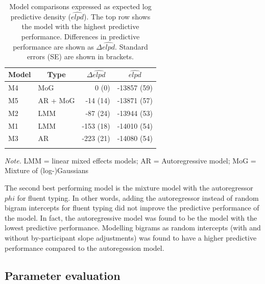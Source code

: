 \documentclass[english,man,floatsintext]{apa7}
\begin{document}
\begin{table}[!ht]

\begin{center}
\begin{threeparttable}

\caption{\label{tab:modelcomparisons}Model comparisons expressed as expected log predictive density ($\widehat{elpd}$). The top row shows the model with the highest predictive performance. Differences in predictive performance are shown as $\Delta\widehat{elpd}$. Standard errors (SE) are shown in brackets.}

\begin{tabular}{llrr}
\toprule
Model & \multicolumn{1}{c}{Type} & \multicolumn{1}{c}{$\Delta\widehat{elpd}$} & \multicolumn{1}{c}{$\widehat{elpd}$}\\
\midrule
M4 & MoG & 0 (0) & -13857 (59)\\
M5 & AR + MoG & -14 (14) & -13871 (57)\\
M2 & LMM & -87 (24) & -13944 (53)\\
M1 & LMM & -153 (18) & -14010 (54)\\
M3 & AR & -223 (21) & -14080 (54)\\
\bottomrule
\addlinespace
\end{tabular}

\begin{tablenotes}[para]
\normalsize{\textit{Note.} LMM = linear mixed effects models; AR = Autoregressive model; MoG = Mixture of (log-)Gaussians}
\end{tablenotes}

\end{threeparttable}
\end{center}

\end{table}

The second best performing model is the mixture model with the autoregressor \(phi\) for fluent typing. In other words, adding the autoregressor instead of random bigram intercepts for fluent typing did not improve the predictive performance of the model. In fact, the autoregressive model was found to be the model with the lowest predictive performance. Modelling bigrams as random intercepts (with and without by-participant slope adjustments) was found to have a higher predictive performance compared to the autoregession model.

\hypertarget{parameter-evaluation}{%
\subsection{Parameter evaluation}\label{parameter-evaluation}}
\end{document}
